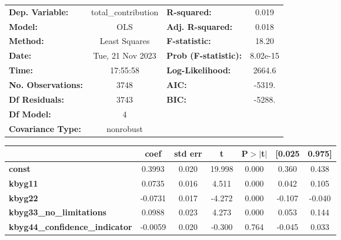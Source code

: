 \begin{center}
\begin{tabular}{lclc}
\toprule
\textbf{Dep. Variable:}                & total\_contribution & \textbf{  R-squared:         } &     0.019   \\
\textbf{Model:}                        &         OLS         & \textbf{  Adj. R-squared:    } &     0.018   \\
\textbf{Method:}                       &    Least Squares    & \textbf{  F-statistic:       } &     18.20   \\
\textbf{Date:}                         &   Tue, 21 Nov 2023  & \textbf{  Prob (F-statistic):} &  8.02e-15   \\
\textbf{Time:}                         &       17:55:58      & \textbf{  Log-Likelihood:    } &    2664.6   \\
\textbf{No. Observations:}             &          3748       & \textbf{  AIC:               } &    -5319.   \\
\textbf{Df Residuals:}                 &          3743       & \textbf{  BIC:               } &    -5288.   \\
\textbf{Df Model:}                     &             4       & \textbf{                     } &             \\
\textbf{Covariance Type:}              &      nonrobust      & \textbf{                     } &             \\
\bottomrule
\end{tabular}
\begin{tabular}{lcccccc}
                                       & \textbf{coef} & \textbf{std err} & \textbf{t} & \textbf{P$> |$t$|$} & \textbf{[0.025} & \textbf{0.975]}  \\
\midrule
\textbf{const}                         &       0.3993  &        0.020     &    19.998  &         0.000        &        0.360    &        0.438     \\
\textbf{kbyg11}                        &       0.0735  &        0.016     &     4.511  &         0.000        &        0.042    &        0.105     \\
\textbf{kbyg22}                        &      -0.0731  &        0.017     &    -4.272  &         0.000        &       -0.107    &       -0.040     \\
\textbf{kbyg33\_no\_limitations}       &       0.0988  &        0.023     &     4.273  &         0.000        &        0.053    &        0.144     \\
\textbf{kbyg44\_confidence\_indicator} &      -0.0059  &        0.020     &    -0.300  &         0.764        &       -0.045    &        0.033     \\

\end{tabular}
\end{center}
